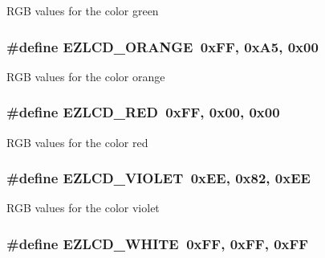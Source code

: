 R\-G\-B values for the color green \hypertarget{group__ez_l_c_d__103__colors_ga2e64a3a5c6ce4a0fddde82dd4ac41d0a}{
\subsubsection[{E\-Z\-L\-C\-D\-\_\-\-O\-R\-A\-N\-G\-E}]{\setlength{\rightskip}{0pt plus 5cm}\#define E\-Z\-L\-C\-D\-\_\-\-O\-R\-A\-N\-G\-E~0x\-F\-F, 0x\-A5, 0x00}}\label{group__ez_l_c_d__103__colors_ga2e64a3a5c6ce4a0fddde82dd4ac41d0a}
R\-G\-B values for the color orange \hypertarget{group__ez_l_c_d__103__colors_gac126383515b8eabf110583df7296eff6}{
\subsubsection[{E\-Z\-L\-C\-D\-\_\-\-R\-E\-D}]{\setlength{\rightskip}{0pt plus 5cm}\#define E\-Z\-L\-C\-D\-\_\-\-R\-E\-D~0x\-F\-F, 0x00, 0x00}}\label{group__ez_l_c_d__103__colors_gac126383515b8eabf110583df7296eff6}
R\-G\-B values for the color red \hypertarget{group__ez_l_c_d__103__colors_ga31df00075e04ecd92600a1416f615c0c}{
\subsubsection[{E\-Z\-L\-C\-D\-\_\-\-V\-I\-O\-L\-E\-T}]{\setlength{\rightskip}{0pt plus 5cm}\#define E\-Z\-L\-C\-D\-\_\-\-V\-I\-O\-L\-E\-T~0x\-E\-E, 0x82, 0x\-E\-E}}\label{group__ez_l_c_d__103__colors_ga31df00075e04ecd92600a1416f615c0c}
R\-G\-B values for the color violet \hypertarget{group__ez_l_c_d__103__colors_ga952952e02b45f2935aa9f59414804b0d}{
\subsubsection[{E\-Z\-L\-C\-D\-\_\-\-W\-H\-I\-T\-E}]{\setlength{\rightskip}{0pt plus 5cm}\#define E\-Z\-L\-C\-D\-\_\-\-W\-H\-I\-T\-E~0x\-F\-F, 0x\-F\-F, 0x\-F\-F}}\label{group__ez_l_c_d__103__colors_ga952952e02b45f2935aa9f59414804b0d}
